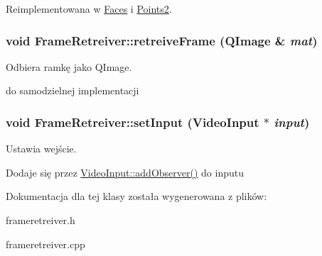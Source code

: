 Reimplementowana w \hyperlink{class_faces_a7fd92e73e117b72898097551b964fd96}{Faces} i \hyperlink{class_points2_af46dd0cd21f73b3214d5f766349b8450}{Points2}.

\hypertarget{class_frame_retreiver_a061c97e43f3b73705903e49afad3e5bf}{
\subsubsection[{retreiveFrame}]{\setlength{\rightskip}{0pt plus 5cm}void FrameRetreiver::retreiveFrame (QImage \& {\em mat})}}
\label{class_frame_retreiver_a061c97e43f3b73705903e49afad3e5bf}


Odbiera ramkę jako QImage. 

do samodzielnej implementacji \hypertarget{class_frame_retreiver_a8d7772f0a3d6373f5a54bf4fcc042ccc}{
\subsubsection[{setInput}]{\setlength{\rightskip}{0pt plus 5cm}void FrameRetreiver::setInput ({\bf VideoInput} $\ast$ {\em input})}}
\label{class_frame_retreiver_a8d7772f0a3d6373f5a54bf4fcc042ccc}


Ustawia wejście. 

Dodaje się przez \hyperlink{class_video_input_ac2370a0c1ea0d4b1ce36c2f9678530a4}{VideoInput::addObserver()} do inputu 

Dokumentacja dla tej klasy została wygenerowana z plików:\begin{DoxyCompactItemize}
\item 
frameretreiver.h\item 
frameretreiver.cpp\end{DoxyCompactItemize}

